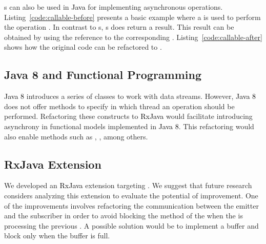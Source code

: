 \documentclass[type=bsc,accentcolor=tud9c]{tudthesis}
\newcommand{\framework}[1]{\textcolor{black}{#1}}
\begin{document}


s can also be used in \framework{Java} for implementing asynchronous operations. Listing~\ref{code:callable-before} presents a basic example where a  is used to perform the operation . In contrast to s, s does return a result. This result can be obtained by using the reference to the corresponding . Listing~\ref{code:callable-after} shows how the original code can be refactored to .



\subsection{Java 8 and Functional Programming}
\framework{Java 8} introduces a series of classes to work with data streams. However, \framework{Java 8} does not offer methods to specify in which thread an operation should be performed. Refactoring these constructs to \framework{RxJava} would facilitate introducing asynchrony in functional models implemented in \framework{Java 8}. This refactoring would also enable methods such as , , among others.



\subsection{RxJava Extension}
We developed an \framework{RxJava} extension targeting . We suggest that future research considers analyzing this extension to evaluate the potential of improvement. One of the improvements involves refactoring the communication between the emitter  and the subscriber  in order to avoid blocking the  method of the  when the  is processing the previous . A possible solution would be to implement a buffer and block only when the buffer is full.


\nocite{*}



\def\appendixstart{\chapter{Appendix} \section{SwingWorker API}\label{swingworkerapi}}


\end{document}
